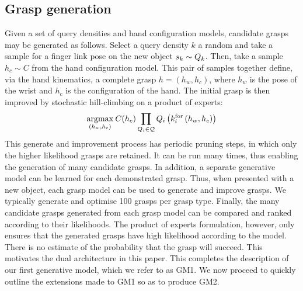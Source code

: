 \subsection{Grasp generation}
Given a set of query densities and hand configuration models, candidate grasps may be generated as follows. Select a query density $k$ a random and take a sample  for a finger link pose on the new object $s_k \sim Q_{k}$. Then, take a sample $h_c \sim C$ from the hand configuration model. This pair of samples together define, via the hand kinematics, a complete grasp $h=(h_w,h_c)$, where $h_w$ is the pose of the wrist and $h_c$ is the configuration of the hand. The initial grasp is then improved by stochastic hill-climbing on a product of experts:
\begin{equation}
\argmax{(h_w, h_c)} \hc(h_c) \prod_{\qd_i \in \mathcal{Q}} \qd_i\left(k_{i}^{\mathrm{for}}\left(h_w, h_c\right)\right)
\label{eq:grasping.product}
\end{equation}
This generate and improvement process has periodic pruning steps, in which only the higher likelihood grasps are retained. It can be run many times, thus enabling the generation of many candidate grasps. In addition, a separate generative model can be learned for each demonstrated grasp. Thus, when presented with a new object, each grasp model can be used to generate and improve grasps. We typically generate and optimise 100 grasps per grasp type. Finally, the many candidate grasps generated from each grasp model can be compared and ranked according to their likelihoods. The product of experts formulation, however, only ensures that the generated grasps have high likelihood according to the model. There is no estimate of the probability that the grasp will succeed. This motivates the dual architecture in this paper. This completes the description of our first generative model, which we refer to as GM1. We now proceed to quickly outline the extensions made to GM1 so as to produce GM2.